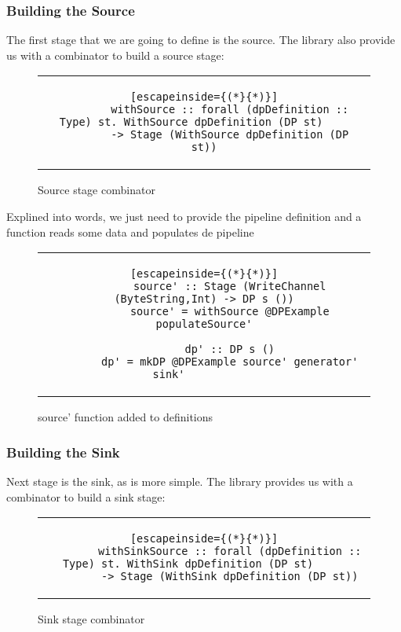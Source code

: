 \subsubsection{Building the Source}
The first stage that we are going to define is the source.
The library also provide us with a combinator to build a source stage:

\begin{figure}[H]
    \centering
    \begin{tabular}{c}
        \begin{lstlisting}[escapeinside={(*}{*)}]
        withSource :: forall (dpDefinition :: Type) st. WithSource dpDefinition (DP st)    
        -> Stage (WithSource dpDefinition (DP st))
        \end{lstlisting}
    \end{tabular}
    \caption{Source stage combinator}
    \label{fig:DP14}
\end{figure}

Explined into words, we just need to provide the pipeline definition and a function reads some data and populates de pipeline

\begin{figure}[H]
    \centering
    \begin{tabular}{c}
        \begin{lstlisting}[escapeinside={(*}{*)}]
        source' :: Stage (WriteChannel (ByteString,Int) -> DP s ())
        source' = withSource @DPExample populateSource'

        dp' :: DP s ()
        dp' = mkDP @DPExample source' generator' sink'           
        \end{lstlisting}
    \end{tabular}
    \caption{source' function added to definitions}
    \label{fig:DP15}
\end{figure}

\subsubsection{Building the Sink}
Next stage is the sink, as is more simple. 
The library provides us with a combinator to build a sink stage:

\begin{figure}[H]
    \centering
    \begin{tabular}{c}
        \begin{lstlisting}[escapeinside={(*}{*)}]
        withSinkSource :: forall (dpDefinition :: Type) st. WithSink dpDefinition (DP st)	  
        -> Stage (WithSink dpDefinition (DP st))
        \end{lstlisting}
    \end{tabular}
    \caption{Sink stage combinator}
    \label{fig:DP16}
\end{figure}

